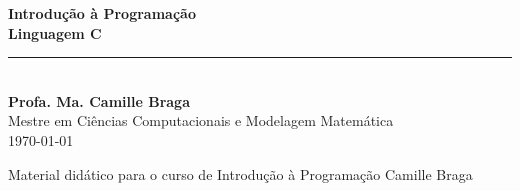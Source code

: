 \documentclass[a4paper,11pt]{book}
\begin{document}
\begin{titlepage}
    \centering
    \vspace*{3cm}

    {\color{azulPrincipal}\Huge\bfseries Introdução à Programação}\\[1cm]
    {\color{azulPrincipal}\Large\bfseries Linguagem C}\\[2cm]

    {\color{verdeC}\rule{0.5\textwidth}{1.5pt}}\\[1cm]

{\Large\textbf{Profa. Ma. Camille Braga}}\\[0.2cm]
    {\normalsize\color{cinzaTexto} Mestre em Ciências Computacionais e Modelagem Matemática}\\[0.5cm]
    {\large\today}

    \vfill

    {\footnotesize\color{cinzaTexto} Material didático para o curso de Introdução à Programação}
     {\footnotesize\color{cinzaTexto} Camille Braga}
\end{titlepage}

\frontmatter
\tableofcontents

\mainmatter


%
%
%
%
%

\backmatter
% 
% 
\end{document}
